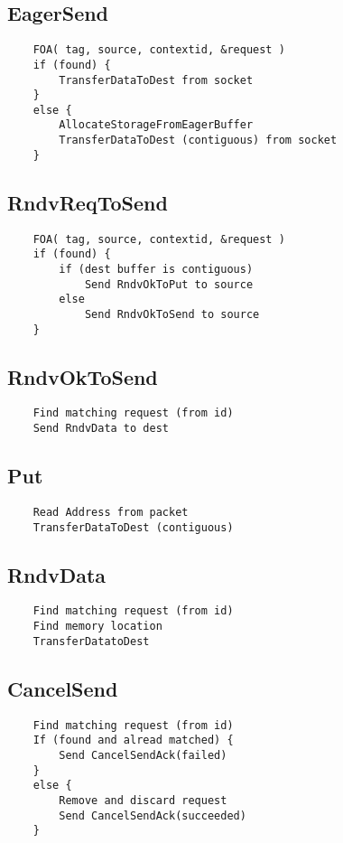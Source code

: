 \documentclass{article}
\begin{document}
\subsection{EagerSend}
\begin{verbatim}
    FOA( tag, source, contextid, &request )
    if (found) {
        TransferDataToDest from socket
    }
    else {
        AllocateStorageFromEagerBuffer
        TransferDataToDest (contiguous) from socket
    }
\end{verbatim}

\subsection{RndvReqToSend}
\begin{verbatim}
    FOA( tag, source, contextid, &request )
    if (found) {
        if (dest buffer is contiguous)
            Send RndvOkToPut to source
        else
            Send RndvOkToSend to source
    }
\end{verbatim}

\subsection{RndvOkToSend}
\begin{verbatim}
    Find matching request (from id)
    Send RndvData to dest
\end{verbatim}

\subsection{Put}
\begin{verbatim}
    Read Address from packet
    TransferDataToDest (contiguous)
\end{verbatim}

\subsection{RndvData}
\begin{verbatim}
    Find matching request (from id)
    Find memory location
    TransferDatatoDest
\end{verbatim}

\subsection{CancelSend}
\begin{verbatim}
    Find matching request (from id)
    If (found and alread matched) {
        Send CancelSendAck(failed)
    }
    else {
        Remove and discard request
        Send CancelSendAck(succeeded)
    }
 \end{verbatim}
\end{document}
